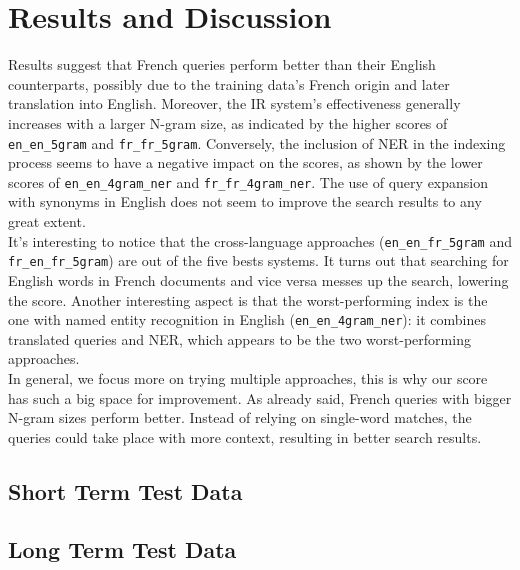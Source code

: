 \section{Results and Discussion}
\label{sec:results}

Results suggest that French queries perform better than their English counterparts, possibly due to the training data's
French origin and later translation into English.
Moreover, the IR system's effectiveness generally increases with a larger N-gram size, as indicated by the higher scores
of \texttt{en\_en\_5gram} and \texttt{fr\_fr\_5gram}.
Conversely, the inclusion of NER in the indexing process seems to have a negative impact on the scores, as shown by the
lower scores of \texttt{en\_en\_4gram\_ner} and \texttt{fr\_fr\_4gram\_ner}.
The use of query expansion with synonyms in English does not seem to improve the search results to any great extent.\\

It's interesting to notice that the cross-language approaches (\texttt{en\_en\_fr\_5gram} and
\texttt{fr\_en\_fr\_5gram}) are out of the five bests systems.
It turns out that searching for English words in French documents and vice versa messes up the search, lowering the
score.
Another interesting aspect is that the worst-performing index is the one with named entity recognition in English
(\texttt{en\_en\_4gram\_ner}): it combines translated queries and NER, which appears to be the two worst-performing
approaches.\\

In general, we focus more on trying multiple approaches, this is why our score has such a big space for improvement.
As already said, French queries with bigger N-gram sizes perform better.
Instead of relying on single-word matches, the queries could take place with more context, resulting in better search
results.\\

\subsection{Short Term Test Data}


\subsection{Long Term Test Data}

